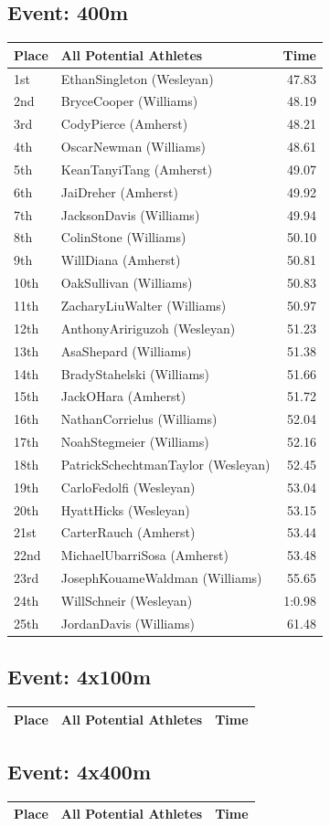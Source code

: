 \documentclass[11pt]{article}
\begin{document}
\subsection*{Event: 400m}
\begin{tabularx}{\linewidth}{lXr}
\toprule
Place & All Potential Athletes & Time \\
\midrule
1st & EthanSingleton (Wesleyan) & 47.83 \\
2nd & BryceCooper (Williams) & 48.19 \\
3rd & CodyPierce (Amherst) & 48.21 \\
4th & OscarNewman (Williams) & 48.61 \\
5th & KeanTanyiTang (Amherst) & 49.07 \\
6th & JaiDreher (Amherst) & 49.92 \\
7th & JacksonDavis (Williams) & 49.94 \\
8th & ColinStone (Williams) & 50.10 \\
9th & WillDiana (Amherst) & 50.81 \\
10th & OakSullivan (Williams) & 50.83 \\
11th & ZacharyLiuWalter (Williams) & 50.97 \\
12th & AnthonyAririguzoh (Wesleyan) & 51.23 \\
13th & AsaShepard (Williams) & 51.38 \\
14th & BradyStahelski (Williams) & 51.66 \\
15th & JackOHara (Amherst) & 51.72 \\
16th & NathanCorrielus (Williams) & 52.04 \\
17th & NoahStegmeier (Williams) & 52.16 \\
18th & PatrickSchechtmanTaylor (Wesleyan) & 52.45 \\
19th & CarloFedolfi (Wesleyan) & 53.04 \\
20th & HyattHicks (Wesleyan) & 53.15 \\
21st & CarterRauch (Amherst) & 53.44 \\
22nd & MichaelUbarriSosa (Amherst) & 53.48 \\
23rd & JosephKouameWaldman (Williams) & 55.65 \\
24th & WillSchneir (Wesleyan) & 1:0.98 \\
25th & JordanDavis (Williams) & 61.48 \\
\bottomrule
\end{tabularx}

\subsection*{Event: 4x100m}
\begin{tabularx}{\linewidth}{lXr}
\toprule
Place & All Potential Athletes & Time \\
\midrule
\bottomrule
\end{tabularx}

\subsection*{Event: 4x400m}
\begin{tabularx}{\linewidth}{lXr}
\toprule
Place & All Potential Athletes & Time \\
\midrule
\bottomrule
\end{tabularx}
\end{document}
